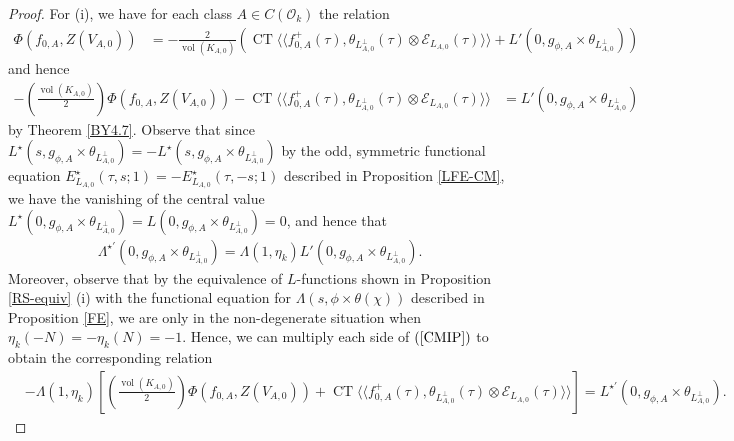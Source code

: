 \documentclass{amsart}
\theoremstyle{definition}
\theoremstyle{definition}
\theoremstyle{definition}
\begin{document}
\begin{proof}

For (i), we have for each class $A \in C(\mathcal{O}_k)$ the relation
\begin{align*} \Phi(f_{0, A}, Z(V_{A, 0})) &= - \frac{2}{\operatorname{vol}(K_{A,0})} \left(
\operatorname{CT} \langle \langle f_{0, A}^+(\tau), \theta_{L_{A, 0}^{\perp}}(\tau) \otimes \mathcal{E}_{L_{A, 0}}(\tau) \rangle \rangle
+ L'(0, g_{\phi, A} \times \theta_{L_{A, 0}^{\perp}}) \right) \end{align*}
and hence 
\begin{align}\label{CMIP} - \left( \frac{ \operatorname{vol}(K_{A,0})  }{ 2} \right) \Phi(f_{0, A}, Z(V_{A, 0})) 
- \operatorname{CT} \langle \langle f_{0, A}^+(\tau), \theta_{L_{A, 0}^{\perp}}(\tau) \otimes \mathcal{E}_{L_{A, 0}}(\tau) \rangle \rangle 
&= L'(0, g_{\phi, A} \times \theta_{L_{A, 0}^{\perp}})  \end{align}
by Theorem \ref{BY4.7}. Observe that since 
$L^{\star}(s, g_{\phi, A} \times \theta_{L_{A,0}^{\perp}}) = - L^{\star}(s, g_{\phi, A} \times \theta_{L_{A,0}^{\perp}})$
by the odd, symmetric functional equation $E_{L_{A,0}}^{\star}(\tau, s; 1) = - E_{L_{A,0}}^{\star}(\tau, -s; 1)$ described in Proposition \ref{LFE-CM}, 
we have the vanishing of the central value 
$L^{\star}(0, g_{\phi, A} \times \theta_{L_{A,0}^{\perp}}) = L(0, g_{\phi, A} \times \theta_{L_{A,0}^{\perp}}) = 0$, and hence that 
\begin{align}\label{CCDV} \Lambda^{\star \prime}(0, g_{\phi, A} \times \theta_{L_{A,0}^{\perp}}) 
= \Lambda(1, \eta_k) L'(0, g_{\phi, A} \times \theta_{L_{A,0}^{\perp}}). \end{align} 
Moreover, observe that by the equivalence of $L$-functions shown in Proposition \ref{RS-equiv} (i)
with the functional equation for $\Lambda(s, \phi \times \theta(\chi))$ described in Proposition \ref{FE}, 
we are only in the non-degenerate situation when $\eta_k(-N) = -\eta_k(N) = -1$.
Hence, we can multiply each side of $(\ref{CMIP})$ to obtain the corresponding relation
\begin{equation} \begin{aligned}\label{CMIP2}  &- \Lambda(1, \eta_k) \left[ \left( \frac{ \operatorname{vol}(K_{A,0})  }{ 2} \right) \Phi(f_{0, A}, Z(V_{A, 0})) 
+ \operatorname{CT} \langle \langle f_{0, A}^+(\tau), \theta_{L_{A, 0}^{\perp}}(\tau) \otimes \mathcal{E}_{L_{A, 0}}(\tau) \rangle \rangle \right] 
= L^{\star \prime}(0, g_{\phi, A} \times \theta_{L_{A, 0}^{\perp}}). \end{aligned}\end{equation}

\end{proof}
\end{document}
